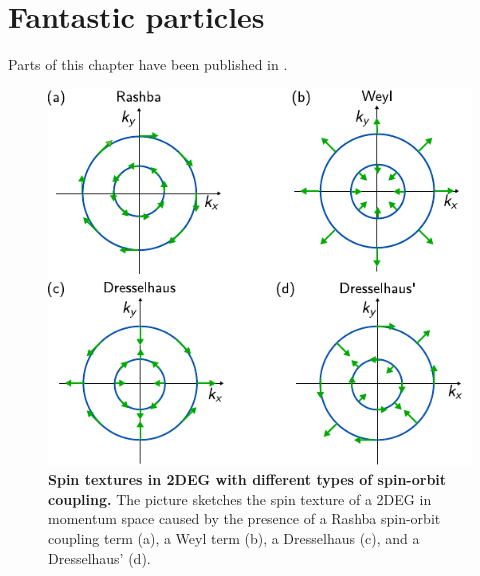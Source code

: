 \documentclass[../main]{subfiles}
\begin{document}
\chapter{Fantastic particles}
\label{ch:electrostatics_and_soc}

\vfill
\begin{disclaimer}
Parts of this chapter have been published in .
\end{disclaimer}

\clearpage

\lipsum[1-10]

\begin{figure}[hbtp]
    \centering
    \includegraphics{ch2/img/spin_textures.pdf}
    \caption{\textbf{Spin textures in 2DEG with different types of spin-orbit coupling.}
    The picture sketches the spin texture of a 2DEG in momentum space caused by the presence of a Rashba spin-orbit coupling term (a), a Weyl term (b), a Dresselhaus (c), and a Dresselhaus' (d).
    }
    \label{fig:spin_textures}
\end{figure}

\lipsum[11-13]

\ifSubfilesClassLoaded{%
\printbibliography
}{}
\end{document}
